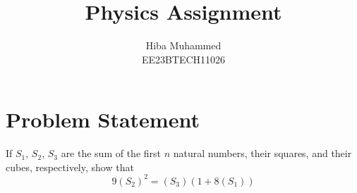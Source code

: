 \documentclass[12pt]{article}
\title{Physics Assignment}
\author{Hiba Muhammed \\
        EE23BTECH11026}
\begin{document}
    \maketitle

\section*{Problem Statement}
If \(S_1\), \(S_2\), \(S_3\) are the sum of the first \(n\) natural numbers, their squares, and their cubes, respectively, show that 
\[ 9(S_2)^2 = (S_3)(1 + 8(S_1)) \]

\end{document}
